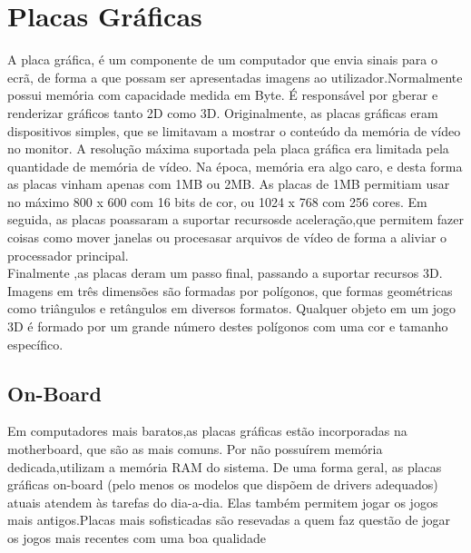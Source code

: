 \chapter{Placas Gráficas}
\label{chap.gráficas}
  A placa gráfica, é um componente de um computador que envia sinais para o ecrã, de forma a que possam ser apresentadas imagens ao utilizador.Normalmente possui memória com capacidade medida em Byte. É responsável por gberar e renderizar gráficos tanto 2D como 3D.
  Originalmente, as placas gráficas eram dispositivos simples, que se limitavam a mostrar o conteúdo da memória de vídeo no monitor. A resolução máxima suportada pela placa gráfica era limitada pela quantidade de memória de vídeo. Na época, memória era algo caro, e desta forma as placas vinham apenas com 1MB ou 2MB. As placas de 1MB permitiam usar no máximo 800 x 600 com 16 bits de cor, ou 1024 x 768 com 256 cores.
  Em seguida, as placas poassaram a suportar recursosde aceleração,que permitem fazer coisas como mover janelas ou procesasar arquivos de vídeo de forma a aliviar o processador principal.\\
Finalmente ,as placas deram um passo final, passando a suportar recursos 3D. Imagens em três dimensões são formadas por polígonos, que formas geométricas como triângulos e retângulos em diversos formatos. Qualquer objeto em um jogo 3D é formado por um grande número destes polígonos com uma cor e tamanho específico.\\  


\section{On-Board}
  Em computadores mais baratos,as placas gráficas estão incorporadas na motherboard, que são as mais comuns. Por não possuírem memória dedicada,utilizam a memória RAM do sistema.
  De uma forma geral, as placas gráficas on-board (pelo menos os modelos que dispõem de drivers adequados) atuais atendem às tarefas do dia-a-dia. Elas também permitem jogar os jogos mais antigos.Placas mais sofisticadas são resevadas a quem faz questão de jogar os jogos mais recentes com uma boa qualidade
